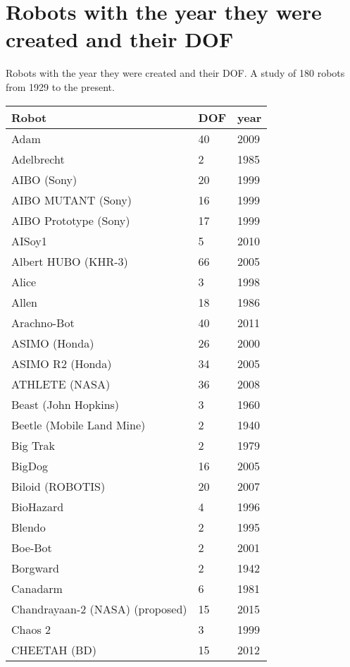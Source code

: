 \chapter{Robots with the year they were created and their DOF}
\Large
\centering
Robots with the year they were created and their DOF.  A study of 180 robots from 1929 to the present.\\
\normalsize
\begin{longtable}{l | l | l }
\hline
Robot	&	DOF	&	year	\\	\hline
\hline
Adam \cite{robotAdam5197424}	&	40	&	2009	\\	\hline
Adelbrecht	&	2	&	1985	\\	\hline
AIBO (Sony)	&	20	&	1999	\\	\hline
AIBO MUTANT (Sony)	&	16	&	1999	\\	\hline
AIBO Prototype (Sony)	&	17	&	1999	\\	\hline
AISoy1	&	5	&	2010	\\	\hline
Albert HUBO (KHR-3)	&	66	&	2005	\\	\hline
Alice	&	3	&	1998	\\	\hline
Allen	&	18	&	1986	\\	\hline
Arachno-Bot	&	40	&	2011	\\	\hline
ASIMO (Honda) \cite{robotasimo}	&	26	&	2000	\\	\hline
ASIMO R2 \cite{robotasimo} (Honda) \cite{robotasimo}	&	34	&	2005	\\	\hline
ATHLETE (NASA)	&	36	&	2008	\\	\hline
Beast (John Hopkins)	&	3	&	1960	\\	\hline
Beetle (Mobile Land Mine)	&	2	&	1940	\\	\hline
Big Trak	&	2	&	1979	\\	\hline
BigDog \cite{robotbigdog5509226}	&	16	&	2005	\\	\hline
Biloid (ROBOTIS)	&	20	&	2007	\\	\hline
BioHazard	&	4	&	1996	\\	\hline
Blendo	&	2	&	1995	\\	\hline
Boe-Bot	&	2	&	2001	\\	\hline
Borgward	&	2	&	1942	\\	\hline
Canadarm	&	6	&	1981	\\	\hline
Chandrayaan-2 (NASA) (proposed)	&	15	&	2015	\\	\hline
Chaos 2	&	3	&	1999	\\	\hline
CHEETAH (BD)	&	15	&	2012	\\	\hline

\end{longtable}
